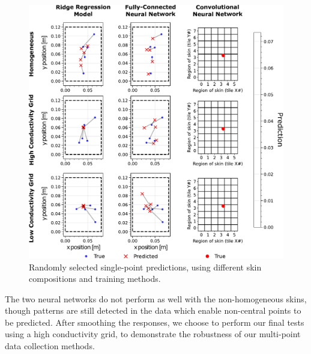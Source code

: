 \begin{figure}[htbp]
  \centering
  \includegraphics[width=\columnwidth]{Images/SingleData.pdf}
  \caption{Randomly selected single-point predictions, using different skin compositions and training methods.}
  \label{fig:singledata}
\end{figure}

The two neural networks do not perform as well with the non-homogeneous skins, though patterns are still detected in the data which enable non-central points to be predicted. After smoothing the responses, we choose to perform our final tests using a high conductivity grid, to demonstrate the robustness of our multi-point data collection methods.



